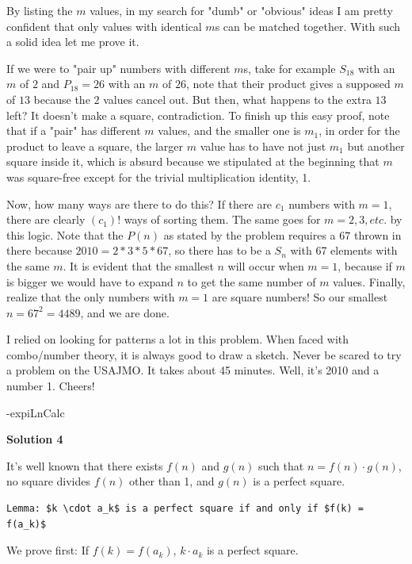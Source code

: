 \begin{enumerate}
 By listing the $m$ values, in my search for "dumb" or "obvious" ideas I am pretty confident that only values with identical $m$s can be matched together. With such a solid idea let me prove it.

 If we were to "pair up" numbers with different $m$s, take for example $S_{18}$ with an $m$ of $2$ and $P_{18}=26$ with an $m$ of $26$, note that their product gives a supposed $m$ of $13$ because the $2$ values cancel out. But then, what happens to the extra $13$ left? It doesn't make a square, contradiction. To finish up this easy proof, note that if a "pair" has different $m$ values, and the smaller one is $m_1$, in order for the product to leave a square, the larger $m$ value has to have not just $m_1$ but another square inside it, which is absurd because we stipulated at the beginning that $m$ was square-free except for the trivial multiplication identity, 1.

 Now, how many ways are there to do this? If there are $c_1$ numbers with $m=1$, there are clearly $(c_1)!$ ways of sorting them. The same goes for $m=2, 3, etc.$ by this logic. Note that the $P(n)$ as stated by the problem requires a $67$ thrown in there because $2010=2*3*5*67$, so there has to be a $S_n$ with 67 elements with the same $m$. It is evident that the smallest $n$ will occur when $m=1$, because if $m$ is bigger we would have to expand $n$ to get the same number of $m$ values. Finally, realize that the only numbers with $m=1$ are square numbers! So our smallest $n=67^2=4489$, and we are done.

 I relied on looking for patterns a lot in this problem. When faced with combo/number theory, it is always good to draw a sketch. Never be scared to try a problem on the USAJMO. It takes about 45 minutes. Well, it's 2010 and a number 1. Cheers!

 -expiLnCalc

 



\textbf{Solution 4}

It's well known that there exists $f(n)$ and $g(n)$ such that $n = f(n) \cdot g(n)$, no square divides $f(n)$ other than 1, and $g(n)$ is a perfect square.

 \begin{verbatim}
Lemma: $k \cdot a_k$ is a perfect square if and only if $f(k) = f(a_k)$ 
\end{verbatim}

We prove first: If $f(k) = f(a_k)$, $k \cdot a_k$ is a perfect square. 


\end{enumerate}
